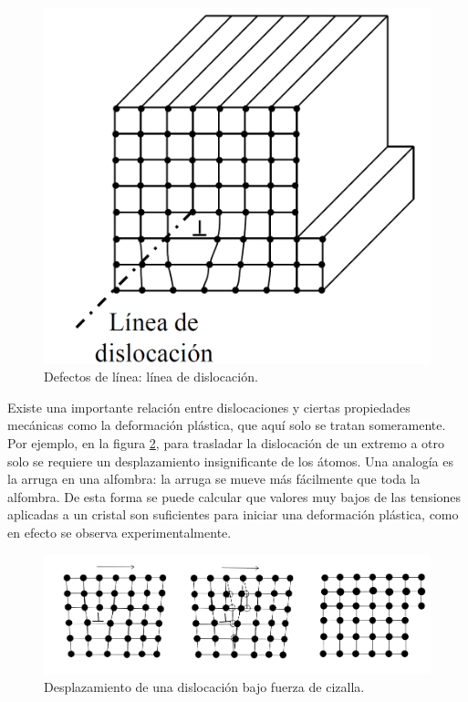\begin{figure}[h!] \centering
    \includegraphics[scale=0.5]{Cuerpo/Ch_01/linea_dislocacion.png}
    \caption{Defectos de línea: línea de dislocación.}
    \label{Fig:01-07}
\end{figure}

Existe una importante relación entre dislocaciones y ciertas propiedades mecánicas como la deformación plástica, que aquí solo se tratan someramente. Por ejemplo, en la figura \ref{Fig:01-08}, para trasladar la dislocación de un extremo a otro solo se requiere un desplazamiento insignificante de los átomos. Una analogía es la arruga en una alfombra: la arruga se mueve más fácilmente que toda la alfombra. De esta forma se puede calcular que valores muy bajos de las tensiones aplicadas a un cristal son suficientes para iniciar una deformación plástica, como en efecto se observa experimentalmente.

\begin{figure}[h!] \centering
    \includegraphics[scale=0.7]{Cuerpo/Ch_01/desplazamiento.png}
    \caption{Desplazamiento de una dislocación bajo fuerza de cizalla.}
    \label{Fig:01-08}
\end{figure}

